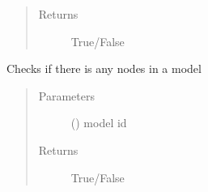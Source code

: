 \documentclass[letterpaper,10pt,english]{sphinxmanual}
\begin{document}
\begin{fulllineitems}
\begin{fulllineitems}
\begin{quote}
\begin{description}
\item[{Returns}] \leavevmode
True/False

\end{description}\end{quote}

\end{fulllineitems}


\begin{fulllineitems}
\label{\detokenize{api:beamon.database.database.Database.has_nodes}}
Checks if there is any nodes in a model
\begin{quote}\begin{description}
\item[{Parameters}] \leavevmode
{} () \textendash{} model id

\item[{Returns}] \leavevmode
True/False

\end{description}\end{quote}

\end{fulllineitems}



\end{fulllineitems}
\end{document}
